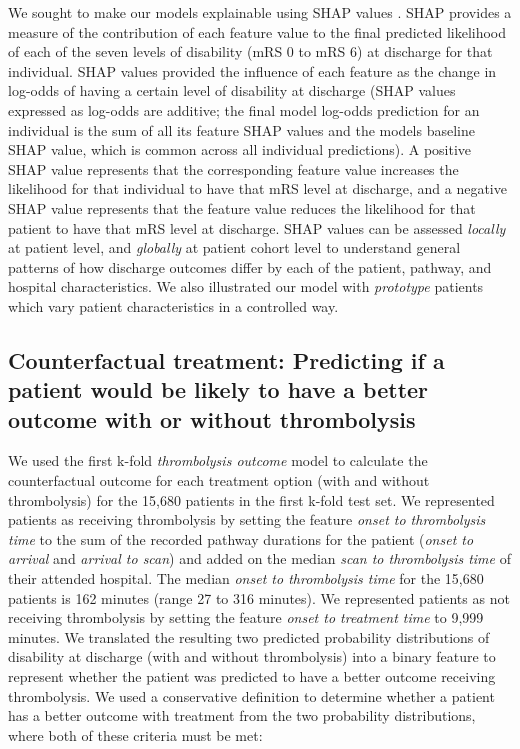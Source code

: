 We sought to make our models explainable using SHAP values \cite{lundberg_unified_2017}. SHAP provides a measure of the contribution of each feature value to the final predicted likelihood of each of the seven levels of disability (mRS 0 to mRS 6) at discharge for that individual. SHAP values provided the influence of each feature as the change in log-odds of having a certain level of disability at discharge (SHAP values expressed as log-odds are additive; the final model log-odds prediction for an individual is the sum of all its feature SHAP values and the models baseline SHAP value, which is common across all individual predictions). A positive SHAP value represents that the corresponding feature value increases the likelihood for that individual to have that mRS level at discharge, and a negative SHAP value represents that the feature value reduces the likelihood for that patient to have that mRS level at discharge. SHAP values can be assessed \textit{locally} at patient level, and \textit{globally} at patient cohort level to understand general patterns of how discharge outcomes differ by each of the patient, pathway, and hospital characteristics. We also illustrated our model with \textit{prototype} patients which vary patient characteristics in a controlled way.

\subsection{Counterfactual treatment: Predicting if a patient would be likely to have a better outcome with or without thrombolysis}

We used the first k-fold \textit{thrombolysis outcome} model to calculate the counterfactual outcome for each treatment option (with and without thrombolysis) for the 15,680 patients in the first k-fold test set. We represented patients as receiving thrombolysis by setting the feature \textit{onset to thrombolysis time} to the sum of the recorded pathway durations for the patient (\textit{onset to arrival} and \textit{arrival to scan}) and added on the median \textit{scan to thrombolysis time} of their attended hospital. The median \textit{onset to thrombolysis time} for the 15,680 patients is 162 minutes (range 27 to 316 minutes). We represented patients as not receiving thrombolysis by setting the feature \textit{onset to treatment time} to 9,999 minutes. We translated the resulting two predicted probability distributions of disability at discharge (with and without thrombolysis) into a binary feature to represent whether the patient was predicted to have a better outcome receiving thrombolysis. We used a conservative definition to determine whether a patient has a better outcome with treatment from the two probability distributions, where both of these criteria must be met: 

